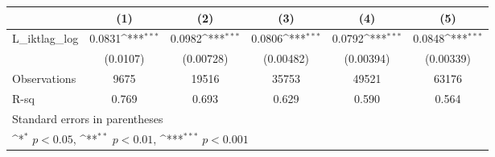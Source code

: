 {
\def\sym#1{\ifmmode^{#1}\else\(^{#1}\)\fi}
\begin{tabular}{l*{5}{c}}
\hline\hline
                &\multicolumn{1}{c}{(1)}         &\multicolumn{1}{c}{(2)}         &\multicolumn{1}{c}{(3)}         &\multicolumn{1}{c}{(4)}         &\multicolumn{1}{c}{(5)}         \\
\hline
L\_iktlag\_log    &   0.0831\sym{***}&   0.0982\sym{***}&   0.0806\sym{***}&   0.0792\sym{***}&   0.0848\sym{***}\\
                & (0.0107)         &(0.00728)         &(0.00482)         &(0.00394)         &(0.00339)         \\
\hline
Observations    &     9675         &    19516         &    35753         &    49521         &    63176         \\
R-sq            &    0.769         &    0.693         &    0.629         &    0.590         &    0.564         \\
\hline\hline
\multicolumn{6}{l}{\footnotesize Standard errors in parentheses}\\
\multicolumn{6}{l}{\footnotesize \sym{*} \(p<0.05\), \sym{**} \(p<0.01\), \sym{***} \(p<0.001\)}\\
\end{tabular}
}
